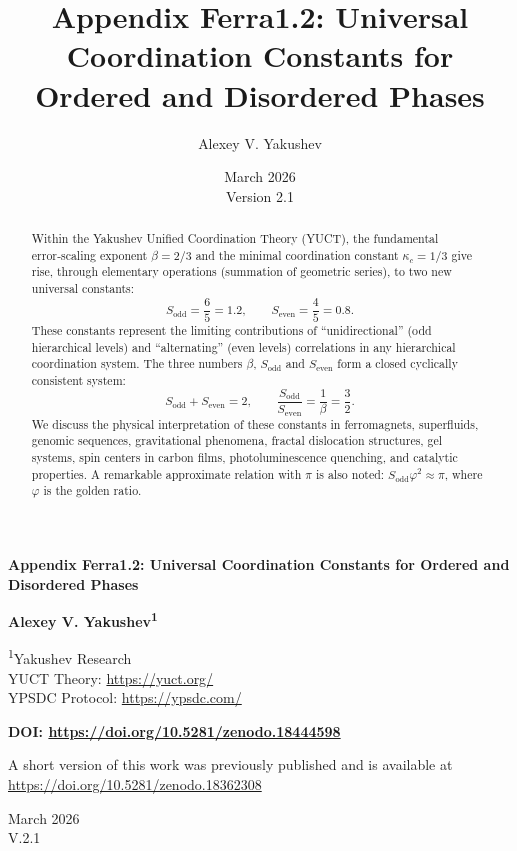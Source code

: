 \documentclass[12pt,a4paper]{article}
\title{Appendix Ferra1.2: Universal Coordination Constants for Ordered and Disordered Phases}
\author{Alexey V. Yakushev}
\date{March 2026 \\ Version 2.1}
\begin{document}
	
	\begin{titlepage}
		\begin{center}
			\vspace*{1cm}
			\Huge\textbf{Appendix Ferra1.2: Universal Coordination Constants for Ordered and Disordered Phases}
			\vspace{1cm}
			
			\Large\textbf{Alexey V. Yakushev\textsuperscript{1}}
			\vspace{0.5cm}
			
			\large
			\textsuperscript{1}Yakushev Research \\
			YUCT Theory: \url{https://yuct.org/} \\
			YPSDC Protocol: \url{https://ypsdc.com/}
			\vspace{1cm}
			
			\textbf{DOI: \url{https://doi.org/10.5281/zenodo.18444598}}
			\vspace{1cm}
			
			\large
			A short version of this work was previously published and is available at \\
			\url{https://doi.org/10.5281/zenodo.18362308}
			\vspace{1cm}
			
			\large
			March 2026 \\ \large V.2.1
			\vspace{1cm}
			
			\begin{minipage}{0.9\textwidth}
				\begin{abstract}
					\noindent
					Within the Yakushev Unified Coordination Theory (YUCT), the fundamental error‑scaling exponent \(\beta = 2/3\) and the minimal coordination constant \(\kappa_c = 1/3\) give rise, through elementary operations (summation of geometric series), to two new universal constants:
					\[
					S_{\text{odd}} = \frac{6}{5}=1.2,\qquad S_{\text{even}} = \frac{4}{5}=0.8.
					\]
					These constants represent the limiting contributions of “unidirectional” (odd hierarchical levels) and “alternating” (even levels) correlations in any hierarchical coordination system. The three numbers \(\beta\), \(S_{\text{odd}}\) and \(S_{\text{even}}\) form a closed cyclically consistent system:
					\[
					S_{\text{odd}}+S_{\text{even}} = 2,\qquad \frac{S_{\text{odd}}}{S_{\text{even}}} = \frac{1}{\beta} = \frac{3}{2}.
					\]
					We discuss the physical interpretation of these constants in ferromagnets, superfluids, genomic sequences, gravitational phenomena, fractal dislocation structures, gel systems, spin centers in carbon films, photoluminescence quenching, and catalytic properties. A remarkable approximate relation with \(\pi\) is also noted: \(S_{\text{odd}}\varphi^2 \approx \pi\), where \(\varphi\) is the golden ratio. 
					

\end{abstract}
\end{minipage}
\end{center}
\end{titlepage}
\end{document}
